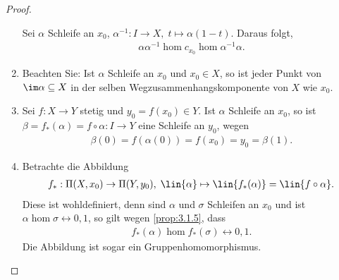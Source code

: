 \begin{proof}
\begin{enumerate}[label=\arabic{*}.)]
Sei $\alpha$ Schleife an $x_0$, $\alpha^{-1} : I\to X,\; t\mapsto \alpha(1-t)$.
Daraus folgt,
\begin{align*}
\alpha\alpha^{-1} \hom c_{x_0}\hom \alpha^{-1}\alpha.
\end{align*}

\item Beachten Sie: Ist $\alpha$ Schleife an $x_0$ und $x_0\in X$, so ist jeder
Punkt von $\im\alpha\subseteq X$ in der selben Wegzusammenhangskomponente von $X$ wie
$x_0$.

\item Sei $f: X\to Y$ stetig und $y_0 = f(x_0)\in Y$. Ist $\alpha$ Schleife an
$x_0$, so ist $\beta = f_*(\alpha) = f\circ\alpha : I\to Y$ eine Schleife an
$y_0$, wegen
\begin{align*}
\beta(0) = f(\alpha(0)) = f(x_0) = y_0 = \beta(1).
\end{align*}

\item Betrachte die Abbildung
\begin{align*}
f_*: \Pi(X,x_0) \to \Pi(Y,y_0),\;
\lin{\alpha}\mapsto \lin{f_*(\alpha)} = \lin{f\circ\alpha}.
\end{align*}
Diese ist wohldefiniert, denn sind $\alpha$ und $\sigma$ Schleifen an $x_0$ und
ist $\alpha\hom\sigma\rel{0,1}$, so gilt wegen \ref{prop:3.1.5}, dass
\begin{align*}
f_*(\alpha) \hom f_*(\sigma) \rel{0,1}.
\end{align*}
Die Abbildung ist sogar ein Gruppenhomomorphismus.\qedhere
\end{enumerate}
\end{proof}

